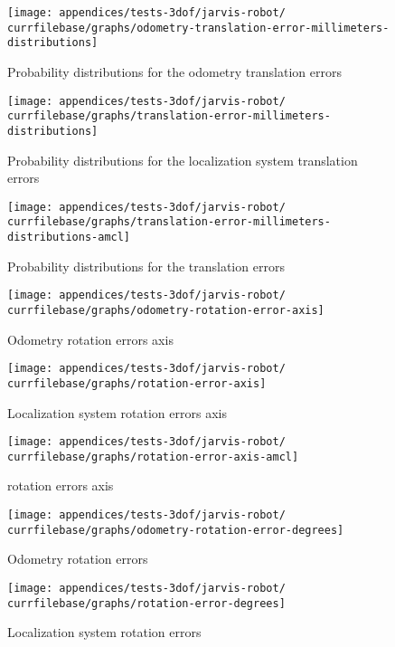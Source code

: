 \begin{figure}[H]
	\centering
	\texttt{[image: appendices/tests-3dof/jarvis-robot/\\currfilebase/graphs/odometry-translation-error-millimeters-distributions]}
	\caption{Probability distributions for the odometry translation errors}
\end{figure}

\begin{figure}[H]
	\centering
	\texttt{[image: appendices/tests-3dof/jarvis-robot/\\currfilebase/graphs/translation-error-millimeters-distributions]}
	\caption{Probability distributions for the localization system translation errors}
\end{figure}

\begin{figure}[H]
	\centering
	\texttt{[image: appendices/tests-3dof/jarvis-robot/\\currfilebase/graphs/translation-error-millimeters-distributions-amcl]}
	\caption{Probability distributions for the  translation errors}
\end{figure}


\begin{figure}[H]
	\centering
	\texttt{[image: appendices/tests-3dof/jarvis-robot/\\currfilebase/graphs/odometry-rotation-error-axis]}
	\caption{Odometry rotation errors axis}
\end{figure}

\begin{figure}[H]
	\centering
	\texttt{[image: appendices/tests-3dof/jarvis-robot/\\currfilebase/graphs/rotation-error-axis]}
	\caption{Localization system rotation errors axis}
\end{figure}

\begin{figure}[H]
	\centering
	\texttt{[image: appendices/tests-3dof/jarvis-robot/\\currfilebase/graphs/rotation-error-axis-amcl]}
	\caption{ rotation errors axis}
\end{figure}


\begin{figure}[H]
	\centering
	\texttt{[image: appendices/tests-3dof/jarvis-robot/\\currfilebase/graphs/odometry-rotation-error-degrees]}
	\caption{Odometry rotation errors}
\end{figure}

\begin{figure}[H]
	\centering
	\texttt{[image: appendices/tests-3dof/jarvis-robot/\\currfilebase/graphs/rotation-error-degrees]}
	\caption{Localization system rotation errors}
\end{figure}

